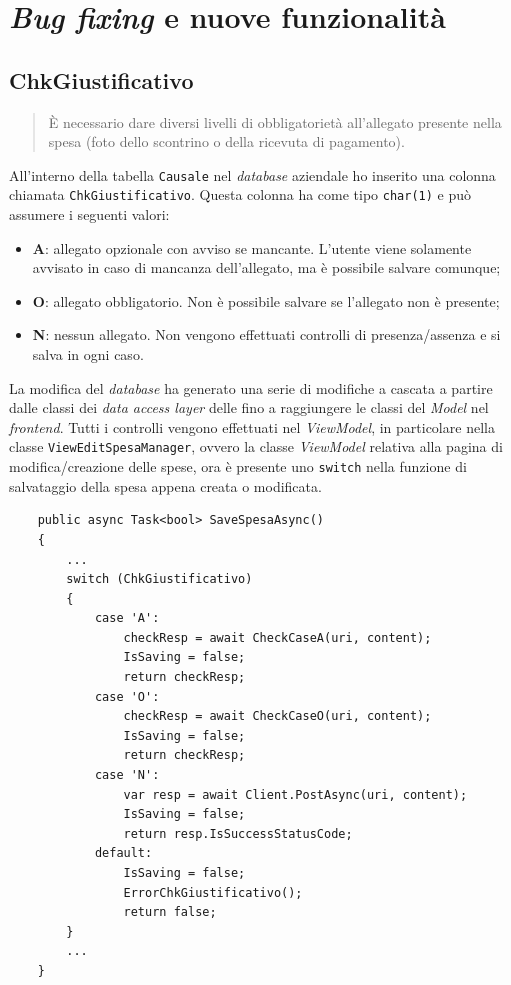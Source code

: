 \section{\textit{Bug fixing} e nuove funzionalità}

\subsection{ChkGiustificativo}

\begin{quote}
    È necessario dare diversi livelli di obbligatorietà all'allegato presente nella spesa (foto dello scontrino o della ricevuta di pagamento).
\end{quote}

\noindent All'interno della tabella \texttt{Causale} nel \textit{database} aziendale ho inserito una colonna chiamata \texttt{ChkGiustificativo}. Questa colonna ha come tipo \texttt{char(1)} e può assumere i seguenti valori:
\begin{itemize}
    \item \textbf{A}: allegato opzionale con avviso se mancante. L'utente viene solamente avvisato in caso di mancanza dell'allegato, ma è possibile salvare comunque;
    \item \textbf{O}: allegato obbligatorio. Non è possibile salvare se l'allegato non è presente;
    \item \textbf{N}: nessun allegato. Non vengono effettuati controlli di presenza/assenza e si salva in ogni caso.
\end{itemize}

\noindent La modifica del \textit{database} ha generato una serie di modifiche a cascata a partire dalle classi dei \textit{data access layer} delle  fino a raggiungere le classi del \textit{Model} nel \textit{frontend}. Tutti i controlli vengono effettuati nel \textit{ViewModel}, in particolare nella classe \texttt{ViewEditSpesaManager}, ovvero la classe \textit{ViewModel} relativa alla pagina di modifica/creazione delle spese, ora è presente uno \texttt{switch} nella funzione di salvataggio della spesa appena creata o modificata.

\begin{verbatim}
    public async Task<bool> SaveSpesaAsync()
    {
        ...
        switch (ChkGiustificativo)
        {
            case 'A':
                checkResp = await CheckCaseA(uri, content);
                IsSaving = false;
                return checkResp;
            case 'O':
                checkResp = await CheckCaseO(uri, content);
                IsSaving = false;
                return checkResp;
            case 'N':
                var resp = await Client.PostAsync(uri, content);
                IsSaving = false;
                return resp.IsSuccessStatusCode;
            default:
                IsSaving = false;
                ErrorChkGiustificativo();
                return false;
        }
        ...
    }
\end{verbatim}

